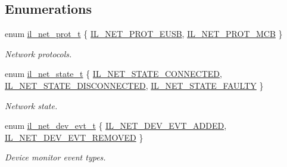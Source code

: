 \subsection*{Enumerations}
\begin{DoxyCompactItemize}
\item 
enum \hyperlink{group__IL__NET_ga9629f7451843e493e7665754b5c2feca}{il\+\_\+net\+\_\+prot\+\_\+t} \{ \hyperlink{group__IL__NET_gga9629f7451843e493e7665754b5c2fecaafb048fa22f8e422dd8af49370e5f24a5}{I\+L\+\_\+\+N\+E\+T\+\_\+\+P\+R\+O\+T\+\_\+\+E\+U\+SB}, 
\hyperlink{group__IL__NET_gga9629f7451843e493e7665754b5c2fecaacdfe55790a47d94d5e6a633598f4eb5c}{I\+L\+\_\+\+N\+E\+T\+\_\+\+P\+R\+O\+T\+\_\+\+M\+CB}
 \}\begin{DoxyCompactList}\small\item\em Network protocols. \end{DoxyCompactList}
\item 
enum \hyperlink{group__IL__NET_ga0391fec0328dc9cfd7b91990998930a7}{il\+\_\+net\+\_\+state\+\_\+t} \{ \hyperlink{group__IL__NET_gga0391fec0328dc9cfd7b91990998930a7a2e3dc49a7ff84f0bae3fc4a237d63fc5}{I\+L\+\_\+\+N\+E\+T\+\_\+\+S\+T\+A\+T\+E\+\_\+\+C\+O\+N\+N\+E\+C\+T\+ED}, 
\hyperlink{group__IL__NET_gga0391fec0328dc9cfd7b91990998930a7abf97cabc9736acafc52a079fe3a98a6f}{I\+L\+\_\+\+N\+E\+T\+\_\+\+S\+T\+A\+T\+E\+\_\+\+D\+I\+S\+C\+O\+N\+N\+E\+C\+T\+ED}, 
\hyperlink{group__IL__NET_gga0391fec0328dc9cfd7b91990998930a7ad761916bd5ecfefe4578e53c39bf8ade}{I\+L\+\_\+\+N\+E\+T\+\_\+\+S\+T\+A\+T\+E\+\_\+\+F\+A\+U\+L\+TY}
 \}\begin{DoxyCompactList}\small\item\em Network state. \end{DoxyCompactList}
\item 
enum \hyperlink{group__IL__NET_ga6e78452befa7532716d8035eb293bc10}{il\+\_\+net\+\_\+dev\+\_\+evt\+\_\+t} \{ \hyperlink{group__IL__NET_gga6e78452befa7532716d8035eb293bc10a643a98c3c2f49473604cdda65b612103}{I\+L\+\_\+\+N\+E\+T\+\_\+\+D\+E\+V\+\_\+\+E\+V\+T\+\_\+\+A\+D\+D\+ED}, 
\hyperlink{group__IL__NET_gga6e78452befa7532716d8035eb293bc10a49f0b316d9ca1d19fa3b31cba22e8581}{I\+L\+\_\+\+N\+E\+T\+\_\+\+D\+E\+V\+\_\+\+E\+V\+T\+\_\+\+R\+E\+M\+O\+V\+ED}
 \}\begin{DoxyCompactList}\small\item\em Device monitor event types. \end{DoxyCompactList}
\end{DoxyCompactItemize}
